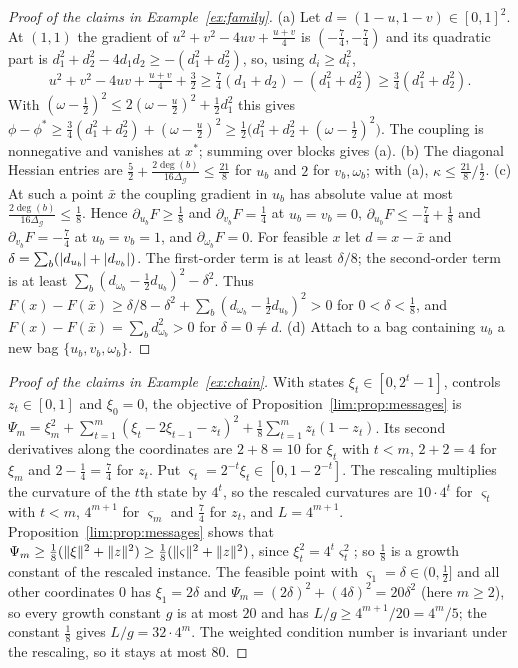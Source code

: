 \begin{proof}[Proof of the claims in Example~\ref{ex:family}]
(a) Let $d=(1-u,1-v)\in[0,1]^2$. At $(1,1)$ the gradient of
$u^2+v^2-4uv+\frac{u+v}4$ is $(-\frac74,-\frac74)$ and its quadratic part is
$d_1^2+d_2^2-4d_1d_2\ge-(d_1^2+d_2^2)$, so, using $d_i\ge d_i^2$,
\[
u^2+v^2-4uv+\tfrac{u+v}4+\tfrac32\ge\tfrac74(d_1+d_2)-(d_1^2+d_2^2)
\ge\tfrac34(d_1^2+d_2^2).
\]
With $(\omega-\frac12)^2\le2(\omega-\frac u2)^2+\frac12d_1^2$ this gives
$\phi-\phi^*\ge\frac34(d_1^2+d_2^2)+(\omega-\frac u2)^2\ge\frac12\bigl(d_1^2+d_2^2
+(\omega-\frac12)^2\bigr)$. The coupling is nonnegative and vanishes at $x^*$;
summing over blocks gives (a). (b) The diagonal Hessian entries are
$\frac52+\frac{2\deg(b)}{16\Delta_{\mathcal G}}\le\frac{21}8$ for $u_b$ and
$2$ for $v_b,\omega_b$; with (a), $\kappa\le\frac{21}8/\frac12$.
(c) At such a point $\bar x$ the coupling gradient in $u_b$ has absolute
value at most $\frac{2\deg(b)}{16\Delta_{\mathcal G}}\le\frac18$. Hence
$\partial_{u_b}F\ge\frac18$ and $\partial_{v_b}F=\frac14$ at $u_b=v_b=0$,
$\partial_{u_b}F\le-\frac74+\frac18$ and $\partial_{v_b}F=-\frac74$ at
$u_b=v_b=1$, and $\partial_{\omega_b}F=0$. For feasible $x$ let $d=x-\bar x$
and $\delta=\sum_b(\lvert d_{u_b}\rvert+\lvert d_{v_b}\rvert)$. The first-order term is at
least $\delta/8$; the second-order term is at least
$\sum_b(d_{\omega_b}-\frac12d_{u_b})^2-\delta^2$. Thus
$F(x)-F(\bar x)\ge\delta/8-\delta^2+\sum_b(d_{\omega_b}-\frac12d_{u_b})^2>0$ for
$0<\delta<\frac18$, and $F(x)-F(\bar x)=\sum_bd_{\omega_b}^2>0$ for $\delta=0\ne d$.
(d) Attach to a bag containing $u_b$ a new bag $\{u_b,v_b,\omega_b\}$.
\end{proof}

\begin{proof}[Proof of the claims in Example~\ref{ex:chain}]
With states $\xi_t\in[0,2^t-1]$, controls $z_t\in[0,1]$ and $\xi_0=0$, the
objective of Proposition~\ref{lim:prop:messages} is
$\Psi_m=\xi_m^2+\sum_{t=1}^m(\xi_t-2\xi_{t-1}-z_t)^2
+\frac18\sum_{t=1}^mz_t(1-z_t)$.
Its second derivatives along the coordinates are $2+8=10$ for $\xi_t$ with
$t<m$, $2+2=4$ for $\xi_m$ and $2-\frac14=\frac74$ for $z_t$. Put
$\varsigma_t=2^{-t}\xi_t\in[0,1-2^{-t}]$. The rescaling multiplies the
curvature of the $t$th state by $4^t$, so the rescaled curvatures are
$10\cdot4^t$ for $\varsigma_t$ with $t<m$, $4^{m+1}$ for $\varsigma_m$ and
$\frac74$ for $z_t$,
and $L=4^{m+1}$. Proposition~\ref{lim:prop:messages} shows that
$\Psi_m\ge\frac18(\lVert \xi\rVert^2+\lVert z\rVert^2)\ge\frac18(\lVert \varsigma\rVert^2+\lVert z\rVert^2)$,
since $\xi_t^2=4^t\varsigma_t^2$; so $\frac18$ is a growth constant of the
rescaled instance. The feasible point with $\varsigma_1=\delta\in(0,\frac12]$
and all other coordinates $0$ has $\xi_1=2\delta$ and
$\Psi_m=(2\delta)^2+(4\delta)^2=20\delta^2$ (here $m\ge2$), so every growth constant
$g$ is at most $20$ and has $L/g\ge4^{m+1}/20=4^m/5$; the constant $\frac18$
gives $L/g=32\cdot4^m$. The weighted condition number is invariant under the
rescaling, so it stays at most $80$.
\end{proof}
